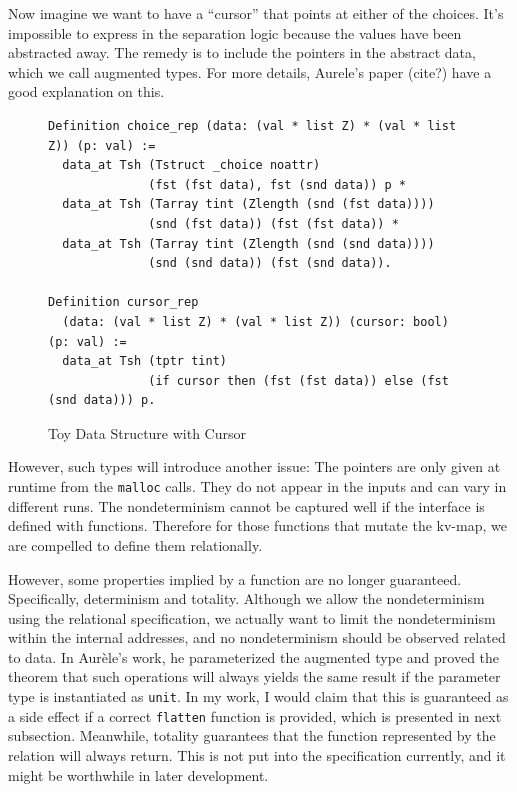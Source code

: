 \documentclass[runningheads]{llncs}
\begin{document}
Now imagine we want to have a ``cursor'' that points at either of the choices.
It's impossible to express in the separation logic because the values have
been abstracted away. The remedy is to include the pointers in the abstract
data, which we call augmented types. For more details, Aurele's paper (cite?)
have a good explanation on this.

\begin{figure}[htbp]
  \centering
\begin{verbatim}
Definition choice_rep (data: (val * list Z) * (val * list Z)) (p: val) :=
  data_at Tsh (Tstruct _choice noattr)
              (fst (fst data), fst (snd data)) p *
  data_at Tsh (Tarray tint (Zlength (snd (fst data))))
              (snd (fst data)) (fst (fst data)) *
  data_at Tsh (Tarray tint (Zlength (snd (snd data))))
              (snd (snd data)) (fst (snd data)).

Definition cursor_rep
  (data: (val * list Z) * (val * list Z)) (cursor: bool) (p: val) :=
  data_at Tsh (tptr tint)
              (if cursor then (fst (fst data)) else (fst (snd data))) p.
\end{verbatim}
  \caption{Toy Data Structure with Cursor}\label{fig:choice_cursor}
\end{figure}

However, such types will introduce another issue: The pointers are only given at
runtime from the \texttt{malloc} calls. They do not appear in the inputs and can
vary in different runs. The nondeterminism cannot be captured well if the
interface is defined with functions. Therefore for those functions that mutate
the kv-map, we are compelled to define them relationally. 

However, some properties implied by a function are no longer guaranteed.
Specifically, determinism and totality. Although we allow the nondeterminism
using the relational specification, we actually want to limit the nondeterminism
within the internal addresses, and no nondeterminism should be observed related
to data. In Aur\`ele's work, he parameterized the augmented type and proved the
theorem that such operations will always yields the same result if the
parameter type is instantiated as \texttt{unit}. In my work, I would claim 
that this is guaranteed as a side effect if a correct \texttt{flatten} function
is provided, which is presented in next subsection. Meanwhile, totality
guarantees that the function represented by the relation will always return.
This is not put into the specification currently, and it might be worthwhile in
later development.
\end{document}

